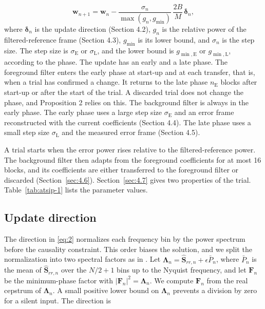 \documentclass[sip,biber]{now-journal}
\begin{document}
\begin{equation}\label{eq:4}\mathbf{w}_{n+1} = \mathbf{w}_n - \frac{\sigma_n}{\max(g_n, g_{\min})}\,\frac{2B}{M}\,\boldsymbol{\delta}_n,\end{equation} where \(\boldsymbol{\delta}_n\) is the update direction (Section 4.2), \(g_n\) is the relative power of the filtered-reference frame (Section 4.3), \(g_{\min}\) is its lower bound, and \(\sigma_n\) is the step size. The step size is \(\sigma_{\mathrm E}\) or \(\sigma_{\mathrm L}\), and the lower bound is \(g_{\min,\mathrm E}\) or \(g_{\min,\mathrm L}\), according to the phase. The update has an early and a late phase. The foreground filter enters the early phase at start-up and at each transfer, that is, when a trial has confirmed a change. It returns to the late phase \(n_{\mathrm E}\) blocks after start-up or after the start of the trial. A discarded trial does not change the phase, and Proposition 2 relies on this. The background filter is always in the early phase. The early phase uses a large step size \(\sigma_{\mathrm E}\) and an error frame reconstructed with the current coefficients (Section 4.4). The late phase uses a small step size \(\sigma_{\mathrm L}\) and the measured error frame (Section 4.5).

A trial starts when the error power rises relative to the filtered-reference power. The background filter then adapts from the foreground coefficients for at most 16 blocks, and its coefficients are either transferred to the foreground filter or discarded (Section~\ref{sec:4.6}). Section~\ref{sec:4.7} gives two properties of the trial. Table~\ref{tab:atsip-1} lists the parameter values.

\hypertarget{sec:4.2}{%
\subsection{Update direction}\label{sec:4.2}}

The direction in \eqref{eq:2} normalizes each frequency bin by the power spectrum before the causality constraint. This order biases the solution, and we split the normalization into two spectral factors as in \cite{elliott2000}. Let \(\boldsymbol{\Lambda}_n = \hat{\mathbf{S}}_{rr,n} + \epsilon \bar{P}_n\), where \(\bar{P}_n\) is the mean of \(\hat{\mathbf{S}}_{rr,n}\) over the \(N/2+1\) bins up to the Nyquist frequency, and let \(\mathbf{F}_n\) be the minimum-phase factor with \(|\mathbf{F}_n|^2 = \boldsymbol{\Lambda}_n\). We compute \(\mathbf{F}_n\) from the real cepstrum of \(\boldsymbol{\Lambda}_n\). A small positive lower bound on \(\boldsymbol{\Lambda}_n\) prevents a division by zero for a silent input. The direction is
\end{document}
